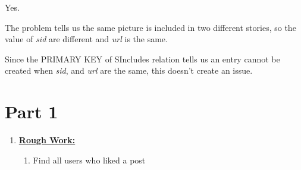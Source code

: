 \documentclass[12pt]{article}
\begin{document}
\begin{enumerate}[1.]
    \bigskip

    \begin{mdframed}

    Yes.

    \bigskip

    The problem tells us the same picture is included in two different stories,
    so the value of \textit{sid} are different and \textit{url} is the same.

    \bigskip

    Since the PRIMARY KEY of SIncludes relation tells us an entry cannot be created when
    \textit{sid}, and \textit{url} are the same, this doesn't create an issue.

    \end{mdframed}

\end{enumerate}

\section*{Part 1}

\begin{enumerate}[1.]
    \item

    \bigskip

    \underline{\textbf{Rough Work:}}

    \bigskip

    \begin{enumerate}[1.]
        \item Find all users who liked a post

        \begin{mdframed}

        \end{mdframed}
    \end{enumerate}

\end{enumerate}
\end{document}
